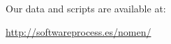 \documentclass[smallextended]{svjour3}       %
\begin{document}

Our data and scripts are available at:

\url{http://softwareprocess.es/nomen/}




\end{document}
